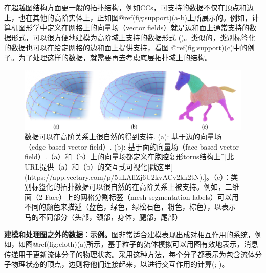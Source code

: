 \documentclass[
  12pt,
]{krantz}
\begin{document}
在超越图结构方面更一般的拓扑结构，例如CCs，可支持的数据不仅在顶点和边上，也在其他的高阶实体上，正如图@ref(fig:support)(a-b)上所展示的。例如，计算机图形学中定义在网格上的向量场（vector
fields）就是边和面上通常支持的数据形式，可以很方便地建模为高阶域上支持的数据形式
()。类似的，类别标签化的数据也可以在给定网格的边和面上提供支持，看图
@ref(fig:support)(c)中的例子。为了处理这样的数据，就需要再去考虑底层拓扑域上的结构。

\begin{figure}

{\centering \includegraphics{figures/two_tori_horse} 

}

\caption{数据可以在高阶关系上很自然的得到支持. (a): 基于边的向量场（edge-based vector field）. (b): 基于面的向量场（face-based vector field）.（a）和（b）上的向量场都定义在胞腔复形torus结构上^[此URL提供（a）和（b）的交互式可视化[戳这里](https://app.vectary.com/p/5uLAflZj6U2kvACv2kk2tN).]。（c）：类别标签化的拓扑数据可以很自然的在高阶关系上被支持。例如，二维面（2-Face）上的网格分割标签（mesh segmentation labels）可以用不同的颜色来描述（蓝色，绿色，绿松石色，粉色，棕色），以表示马的不同部分（头部，颈部，身体，腿部，尾部）}\label{fig:support}
\end{figure}

\textbf{建模和处理图之外的数据：示例。}图非常适合建模表现出成对相互作用的系统，例如，如图@ref(fig:cloth)(a)所示，基于粒子的流体模拟可以用图有效地表示，消息传递用于更新流体分子的物理状态。采用这种方法，每个分子都表示为包含流体分子物理状态的顶点，边则将他们连接起来，以进行交互作用的计算(; )。
\end{document}
